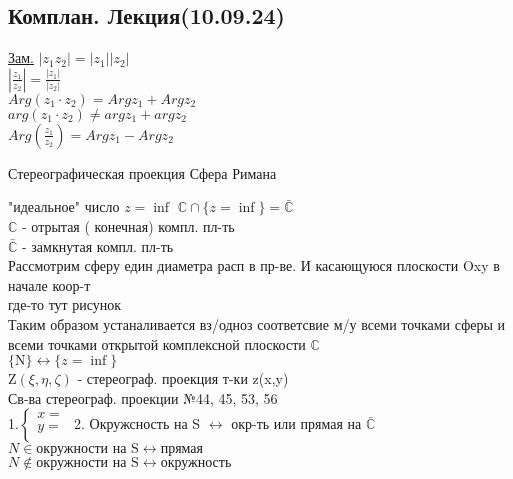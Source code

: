\documentclass[12pt]{article}
\begin{document}
\begin{center}
\section*{Комплан. Лекция(10.09.24)}
\end{center}

\underline{Зам.} $| z_1 z_2 | = |z_1| |z_2|$ \\
$ |\frac{z_1}{z_2}| = \frac{|z_1|}{|z_2|} $ \\
$ Arg(z_1 \cdot z_2) = Argz_1 + Argz_2 $ \\
$ arg(z_1 \cdot z_2) \neq argz_1 + argz_2 $ \\
$ Arg(\frac{z_1}{z_2}) = Argz_1 - Argz_2 $ \\
\begin{center}
    Стереографическая проекция Сфера Римана
\end{center}

"идеальное" число $z = \inf $
$ \mathbb{C} \cap \{z=\inf\} = \bar{\mathbb{C}} $ \\ 
$ \mathbb{C} $ - отрытая ( конечная) компл. пл-ть \\
$ \bar{\mathbb{C}} $ - замкнутая компл. пл-ть \\
Рассмотрим сферу един диаметра расп в пр-ве. И касающуюся плоскости Oxy в 
начале коор-т \\

где-то тут рисунок\\

Таким образом устаналивается вз/одноз соответсвие м/у всеми точками сферы и
всеми точками открытой комплексной плоскости $ \mathbb{C} $ \\
$ \{ \text{N} \} \leftrightarrow \{ z = \inf\} $ \\
$ \text{Z}(\xi, \eta, \zeta) $ - стереограф. проекция т-ки z(x,y) \\

Св-ва стереограф. проекции №44, 45, 53, 56 \\
1.$ \begin{cases} 
    x =  \\ 
    y = \\ 
\end{cases}
$
2. Окружсность на S $\leftrightarrow $ окр-ть или прямая на $\bar{\mathbb{C}}$ \\

$ N \in \text{окружности на S} \leftrightarrow \text{прямая} $ \\
$ N \notin \text{окружности на S} \leftrightarrow \text{окружность} $ \\
\end{document}
